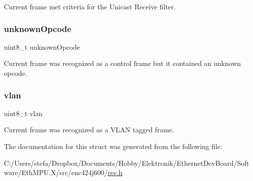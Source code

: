 Current frame met criteria for the Unicast Receive filter. 

\mbox{\label{struct_r_s_v__t_a57538bc935cb3aac5c51829f01b013af}} 
\subsubsection{\texorpdfstring{unknownOpcode}{unknownOpcode}}
{\footnotesize\ttfamily uint8\+\_\+t unknown\+Opcode}



Current frame was recognized as a control frame but it contained an unknown opcode. 

\mbox{\label{struct_r_s_v__t_a1658beabbd0704b4ab87c15e91efe371}} 
\subsubsection{\texorpdfstring{vlan}{vlan}}
{\footnotesize\ttfamily uint8\+\_\+t vlan}



Current frame was recognized as a V\+L\+AN tagged frame. 



The documentation for this struct was generated from the following file\+:\begin{DoxyCompactItemize}
\item 
C\+:/\+Users/stefa/\+Dropbox/\+Documents/\+Hobby/\+Elektronik/\+Ethernet\+Dev\+Board/\+Software/\+Eth\+M\+P\+U.\+X/src/enc424j600/\mbox{\hyperlink{rsv_8h}{rsv.\+h}}\end{DoxyCompactItemize}
